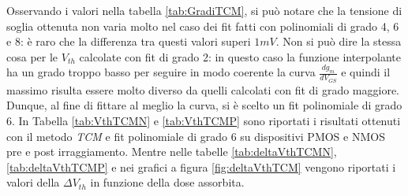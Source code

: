Osservando i valori nella tabella \ref{tab:GradiTCM}, si può notare che la tensione di soglia ottenuta non varia molto nel caso dei fit fatti con polinomiali di grado 4, 6 e 8: è raro che la differenza tra questi valori superi $1 mV$. Non si può dire la stessa cosa per le $V_{th}$ calcolate con fit di grado 2: in questo caso la funzione interpolante ha un grado troppo basso per seguire in modo coerente la curva $\frac{dg_m}{dV_{GS}}$ e quindi il massimo risulta essere molto diverso da quelli calcolati con fit di grado maggiore. Dunque, al fine di fittare al meglio la curva, si è scelto un fit polinomiale di grado 6. In Tabella \ref{tab:VthTCMN} e \ref{tab:VthTCMP} sono riportati i risultati ottenuti con il metodo \emph{TCM} e fit polinomiale di grado 6 su dispositivi PMOS e NMOS pre e post irraggiamento.
Mentre nelle tabelle \ref{tab:deltaVthTCMN}, \ref{tab:deltaVthTCMP} e nei grafici a figura \ref{fig:deltaVthTCM} vengono riportati i valori della $\Delta V_{th}$ in funzione della dose assorbita.



